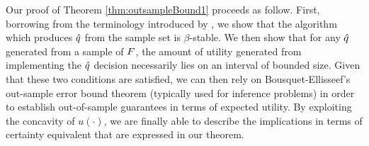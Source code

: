 Our proof of Theorem \ref{thm:outsampleBound1} proceeds as follow. First, borrowing from
the terminology introduced by \cite{bousquet2002stability}, we show that the algorithm
which produces ${\hat{q}}$ from the sample set is $\beta$-stable. We then show that for any
${\hat{q}}$ generated from a sample of $F$, the amount of utility generated from implementing
the ${\hat{q}}$ decision necessarily lies on an interval of bounded size. Given that these two
conditions are satisfied, we can then rely on Bousquet-Ellisseef's out-sample error bound
theorem (typically used for inference problems) in order to establish out-of-sample
guarantees in terms of expected utility. By exploiting the concavity of $u(\cdot)$, we are
finally able to describe the implications in terms of certainty equivalent that are
expressed in our theorem.



